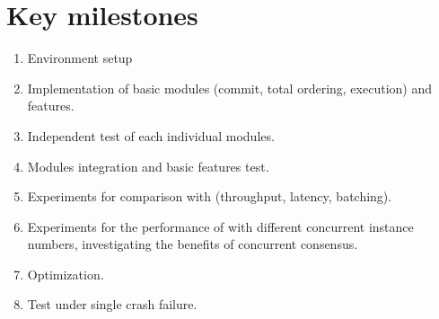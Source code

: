 
\section{Key milestones}
\begin{enumerate}
    \item Environment setup
    \item Implementation of basic modules (commit, total ordering, execution) and features.
    \item Independent test of each individual modules.
    \item Modules integration and basic features test.
    \item Experiments for comparison with \PBFT{} (throughput, latency, batching).
    \item Experiments for the performance of \RCC{} with different concurrent instance numbers, investigating the benefits of concurrent consensus.
    \item Optimization.
    \item Test under single crash failure.
\end{enumerate}